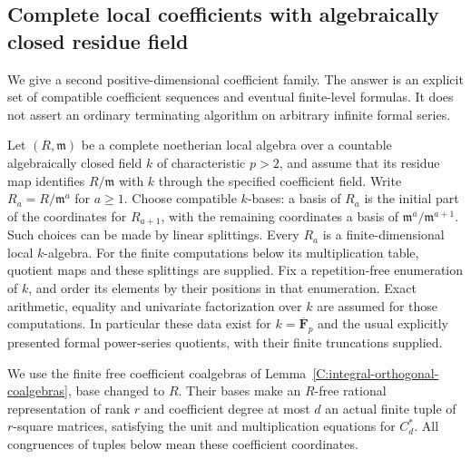 \subsection{Complete local coefficients with algebraically closed residue field}
\label{C:complete-algclosed-subsection}

We give a second positive-dimensional coefficient family.  The answer is
an explicit set of compatible coefficient sequences and eventual
finite-level formulas.  It does not assert an ordinary terminating
algorithm on arbitrary infinite formal series.

Let $(R,\mathfrak m)$ be a complete noetherian local algebra over a
countable algebraically closed field $k$ of characteristic $p>2$, and
assume that its residue map identifies $R/\mathfrak m$ with $k$ through
the specified coefficient field.  Write $R_a=R/\mathfrak m^a$ for
$a\geq1$.  Choose compatible $k$-bases: a basis of $R_a$ is the initial
part of the coordinates for $R_{a+1}$, with the remaining coordinates a
basis of $\mathfrak m^a/\mathfrak m^{a+1}$.  Such choices can be made by
linear splittings.  Every $R_a$ is a finite-dimensional local $k$-algebra.
For the finite computations below its multiplication table, quotient maps
and these splittings are supplied.  Fix a repetition-free enumeration of
$k$, and order its elements by their positions in that enumeration.
Exact arithmetic, equality and univariate factorization over $k$ are
assumed for those computations.  In particular these data exist for
$k=\overline{\mathbf F}_p$ and the usual explicitly presented formal
power-series quotients, with their finite truncations supplied.

We use the finite free coefficient coalgebras of
Lemma~\ref{C:integral-orthogonal-coalgebras}, base changed to $R$.
Their bases make an $R$-free rational representation of rank $r$ and
coefficient degree at most $d$ an actual finite tuple of $r$-square
matrices, satisfying the unit and multiplication equations for $C_d^*$.
All congruences of tuples below mean these coefficient coordinates.

